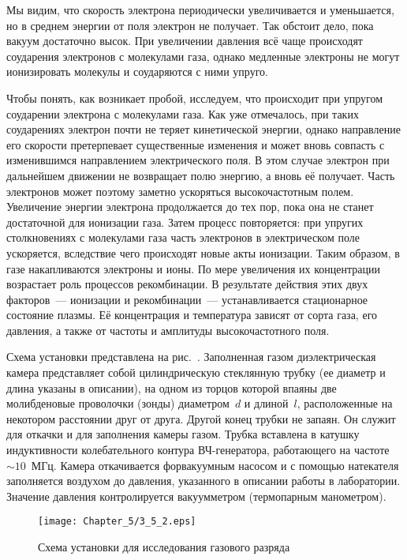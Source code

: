 Мы видим, что скорость электрона периодически увеличивается и уменьшается, но в
среднем энергии от поля электрон не
получает. Так обстоит дело, пока вакуум достаточно высок. При увеличении
давления всё чаще происходят соударения
электронов с молекулами газа, однако медленные электроны не могут ионизировать
молекулы и соударяются с ними упруго.

Чтобы понять, как возникает пробой, исследуем, что происходит при упругом
соударении электрона с молекулами газа. Как уже отмечалось, при таких
соударениях электрон почти не теряет кинетической энергии, однако направление
его скорости претерпевает существенные изменения и может вновь совпасть с
изменившимся направлением электрического поля. В этом случае электрон при
дальнейшем движении не возвращает полю энергию, а вновь её получает. Часть
электронов может поэтому заметно ускоряться высокочастотным полем. Увеличение
энергии электрона продолжается до тех пор, пока она не станет достаточной для
ионизации газа. Затем процесс повторяется: при упругих столкновениях с
молекулами газа часть электронов
в электрическом поле ускоряется, вследствие чего происходят новые акты
ионизации. Таким образом, в газе накапливаются электроны и ионы. По мере
увеличения их концентрации возрастает роль процессов рекомбинации. В результате
действия этих двух факторов~--- ионизации и рекомбинации~---
устанавливается стационарное состояние плазмы.
Её концентрация и температура зависят от сорта газа, его давления,
а также от частоты и амплитуды высокочастотного поля.

\experiment
Схема установки представлена на рис.~.
Заполненная газом диэлектрическая камера представляет собой цилиндрическую
стеклянную трубку (ее диаметр и длина указаны в описании), на одном из торцов
которой впаяны две молибденовые проволочки (зонды)
диаметром~$d$ и длиной~$l$, расположенные на некотором расстоянии друг от друга.
Другой конец трубки не запаян.
Он служит для откачки и для заполнения камеры газом. Трубка вставлена в катушку
индуктивности колебательного контура
ВЧ-генератора, работающего на частоте~$\sim10$~МГц. Камера откачивается
форвакуумным насосом и с помощью натекателя
заполняется воздухом до давления, указанного в описании работы в лаборатории.
Значение давления контролируется вакуумметром
(термопарным манометром).

\begin{figure}[h!]
    \centering
	\texttt{[image: Chapter\_5/3\_5\_2.eps]}
	\caption{Схема установки для исследования газового разряда}
\end{figure}


